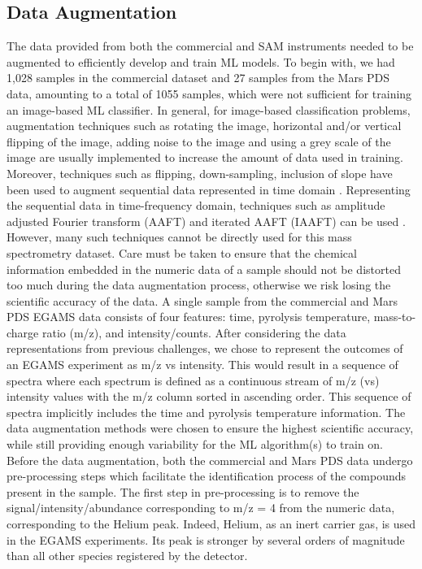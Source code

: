 \subsection{Data Augmentation} \label{sec:mars_dataaug}

The data provided from both the commercial and SAM instruments needed to be augmented to efficiently develop and train ML models. To begin with, we had 1,028 samples in the commercial dataset and 27 samples from the Mars PDS data, amounting to a total of 1055 samples, which were not sufficient for training an image-based ML classifier. In general, for image-based classification problems, augmentation techniques such as rotating the image, horizontal and/or vertical flipping of the image, adding noise to the image and using a grey scale of the image are usually implemented to increase the amount of data used in training. Moreover, techniques such as flipping, down-sampling, inclusion of slope have been used to augment sequential data represented in time domain \cite{wen2020time}. Representing the sequential data in time-frequency domain, techniques such as amplitude adjusted Fourier transform (AAFT) and iterated AAFT (IAAFT) can be used \cite{lee2019surrogate}. However, many such techniques cannot be directly used for this mass spectrometry dataset. Care must be taken to ensure that the chemical information embedded in the numeric data of a sample should not be distorted too much during the data augmentation process, otherwise we risk losing the scientific accuracy of the data.
A single sample from the commercial and Mars PDS EGAMS data consists of four features: time, pyrolysis temperature, mass-to-charge ratio (m/z), and intensity/counts. After considering the data representations from previous challenges, we chose to represent the outcomes of an EGAMS experiment as m/z vs intensity. This would result in a sequence of spectra where each spectrum is defined as a continuous stream of m/z (vs) intensity values with the m/z column sorted in ascending order. This sequence of spectra implicitly includes the time and pyrolysis temperature information. The data augmentation methods were chosen to ensure the highest scientific accuracy, while still providing enough variability for the ML algorithm(s) to train on.
Before the data augmentation, both the commercial and Mars PDS data undergo pre-processing steps which facilitate the identification process of the compounds present in the sample. The first step in pre-processing is to remove the signal/intensity/abundance corresponding to m/z = 4 from the numeric data, corresponding to the Helium peak. Indeed, Helium, as an inert carrier gas, is used in the EGAMS experiments. Its peak is stronger by several orders of magnitude than all other species registered by the detector.
